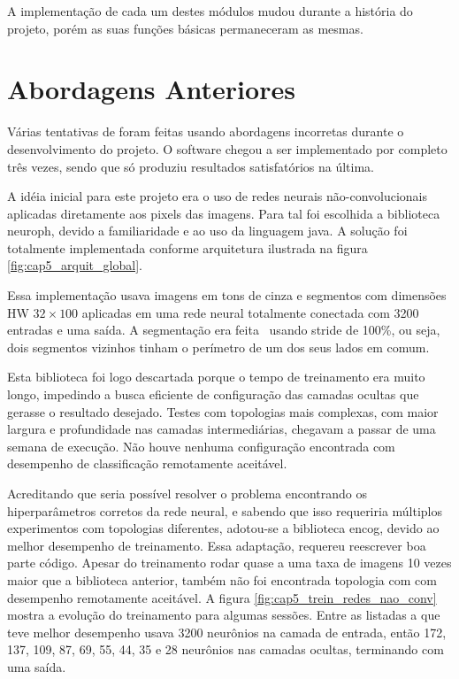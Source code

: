 A implementação de cada um destes módulos mudou durante a história do projeto,
porém as suas funções básicas permaneceram as mesmas.

\section{Abordagens Anteriores}
Várias tentativas de foram feitas usando abordagens incorretas durante o
desenvolvimento do projeto. O software chegou a ser implementado por completo
três vezes, sendo que só produziu resultados satisfatórios na última.

A idéia inicial para este projeto era o uso de redes neurais não-convolucionais
aplicadas diretamente aos pixels das imagens. Para tal foi escolhida a
biblioteca neuroph, devido a familiaridade e ao uso da linguagem java. A
solução foi totalmente implementada conforme arquitetura ilustrada na figura
\ref{fig:cap5_arquit_global}.

Essa implementação usava imagens em tons de cinza e segmentos com dimensões HW
$32 \times 100$ aplicadas em uma rede neural totalmente conectada com 3200
entradas e uma saída. A segmentação era feita  usando stride de 100\%, ou
seja, dois segmentos vizinhos tinham o perímetro de um dos seus lados em comum.

Esta biblioteca foi logo descartada porque o tempo de treinamento era muito
longo, impedindo a busca eficiente de configuração das camadas ocultas que
gerasse o resultado desejado. Testes com topologias mais complexas, com maior
largura e profundidade nas camadas intermediárias, chegavam a passar de uma
semana de execução. Não houve nenhuma configuração encontrada com desempenho de
classificação remotamente aceitável.

Acreditando que seria possível resolver o problema encontrando os
hiperparâmetros corretos da rede neural, e sabendo que isso requeriria
múltiplos experimentos com topologias diferentes, adotou-se a biblioteca encog,
devido ao melhor desempenho de treinamento. Essa adaptação, requereu reescrever
boa parte código. Apesar do treinamento rodar quase a uma taxa de imagens 10
vezes maior que a biblioteca anterior, também não foi encontrada topologia
com com desempenho remotamente aceitável. A figura
\ref{fig:cap5_trein_redes_nao_conv} mostra a
evolução do treinamento para algumas sessões. Entre as listadas a que teve
melhor desempenho usava 3200 neurônios na camada de entrada, então 172, 137,
109, 87, 69, 55, 44, 35 e 28 neurônios nas camadas ocultas, terminando
com uma saída.

